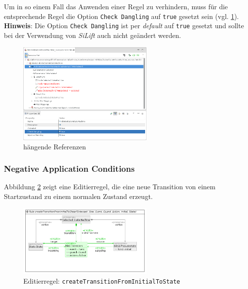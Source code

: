 \documentclass[a4paper]{scrartcl}
\begin{document}
Um in so einem Fall das Anwenden einer Regel zu verhindern, muss für die entsprechende Regel die Option \texttt{Check Dangling} auf \texttt{true} gesetzt sein (vgl. \ref{silift-silift-editrule_delete_stateInStateMachine_checkDangling}).\\

\textbf{Hinweis}: Die Option \texttt{Check Dangling} ist per \textit{default} auf \texttt{true} gesetzt und sollte bei der Verwendung von \textit{SiLift} auch nicht geändert werden.


\begin{figure}[H]
\centering
\includegraphics[width=0.6\textwidth]{graphics/silift-editrule_delete_stateInStateMachine_checkDangling.png}
\caption{hängende Referenzen}
\label{silift-silift-editrule_delete_stateInStateMachine_checkDangling}
\end{figure}


\subsubsection*{Negative Application Conditions}

Abbildung \ref{silift-editrule_create_transitionFromInitialToState} zeigt eine Editierregel, die eine neue Transition von einem Startzustand zu einem normalen Zustand erzeugt.

\begin{figure}[H]
\centering
\includegraphics[width=0.6\textwidth]{graphics/silift-editrule_create_transitionFromInitialToState.png}
\caption{Editierregel: \texttt{createTransitionFromInitialToState}}
\label{silift-editrule_create_transitionFromInitialToState}
\end{figure}
\end{document}
